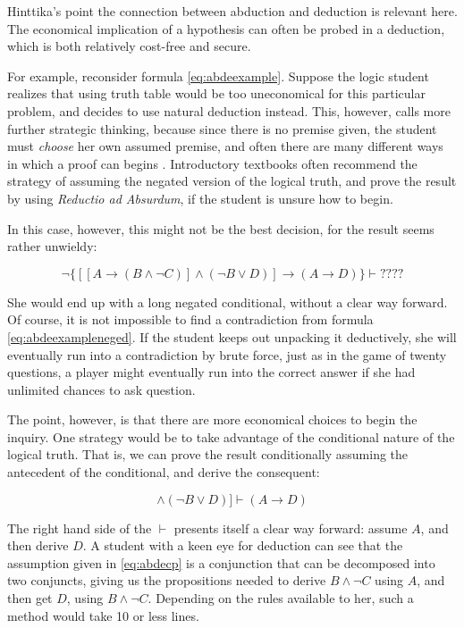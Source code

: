 Hinttika's point the connection between abduction and deduction is relevant here. The economical implication of a hypothesis can often be probed in a deduction, which is both relatively cost-free and secure. 

For example, reconsider formula \ref{eq:abdeexample}. Suppose the logic student realizes that using truth table would be too uneconomical for this particular problem, and decides to use natural deduction instead. This, however, calls more further strategic thinking, because since there is no premise given, the student must \emph{choose} her own assumed premise, and often there are many different ways in which a proof can begins . Introductory textbooks often recommend the strategy of  assuming the negated version of the logical truth, and prove the result by using \emph{Reductio ad Absurdum}, if the student is unsure how to begin.

 In this case, however, this might not be the best decision, for the result seems rather unwieldy:
 
 \begin{equation}
	  \neg \{[[A\to(B\wedge \neg C)] \wedge (\neg B \vee D) ]\to (A\to D)\}\vdash ????
	\label{eq:abdeexampleneged}
\end{equation}

She would end up with a long negated conditional, without a clear way forward. Of course, it is not impossible to find a contradiction from  formula \ref{eq:abdeexampleneged}. If the student keeps out unpacking it deductively, she will eventually run into a contradiction by brute force, just as in the game of twenty questions, a player might eventually run into the correct answer if she had unlimited chances to ask question. 

The point, however, is that there are more economical choices to begin the inquiry. One strategy would be to take advantage of the conditional nature of the logical truth. That is, we can prove the result conditionally assuming the antecedent of the conditional, and derive the consequent:

\begin{equation}
	 [[A\to(B\wedge \neg C)] \wedge (\neg B \vee D) ]\vdash (A\to D)
	\label{eq:abdecp}
\end{equation}

The right hand side of the $\vdash$ presents itself a clear way forward: assume $A$, and then derive $D$.  A student with a keen eye for deduction can see that the assumption given in \ref{eq:abdecp} is a conjunction that can be decomposed into two conjuncts, giving us the propositions needed to derive $B\wedge \neg C$ using $A$, and then get $D$, using $B\wedge \neg C$.  Depending on the rules available to her, such a method would take 10 or less lines. 

